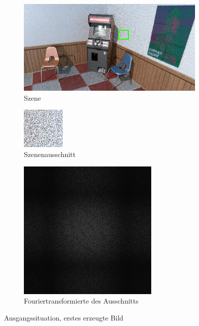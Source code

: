 \begin{figure}[H]
    \begin{subfigure}{\textwidth}
        \centering \includegraphics[width=0.7\linewidth]{content/TemporalerAlg/Bilder/WhiteNoise/Szene.png}
        \caption{Szene}
        \label{fig:Szene_Weißes Rauschen}
    \end{subfigure}
    \begin{subfigure}{0.5\textwidth}
        \centering \includegraphics[width=0.5\linewidth]{content/TemporalerAlg/Bilder/WhiteNoise/Ausschnitt.png} 
        \caption{Szenenausschnitt}
        \label{fig:ausschnitt_Weißes_Rauschen}
    \end{subfigure}
    \begin{subfigure}{0.5\textwidth}
        \centering \includegraphics[width=0.5\linewidth]{content/TemporalerAlg/Bilder/WhiteNoise/Spektrum.png}
        \caption{Fouriertransformierte des Ausschnitts}
        \label{fig:Fouriertransformierte_Weißes_Rauschen}
    \end{subfigure}
        \caption{Ausgangssituation, erstes erzeugte Bild}
        \label{fig:Path Tracer mit zufälligen Seeds}
\end{figure}


